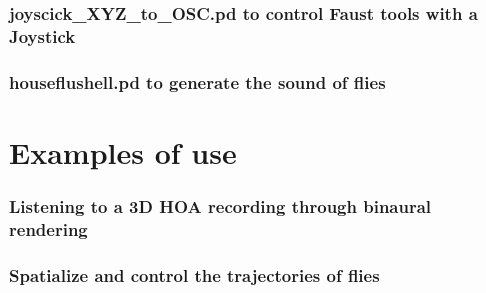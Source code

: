 \documentclass[10pt,a4paper]{article}
\begin{document}
\subsubsection{joyscick\_XYZ\_to\_OSC.pd to control Faust tools with a Joystick}
\subsubsection{houseflushell.pd to generate the sound of flies}

\section{Examples of use}
\subsubsection{Listening to a 3D HOA recording through binaural rendering}
\subsubsection{Spatialize and control the trajectories of flies}


\end{document}
